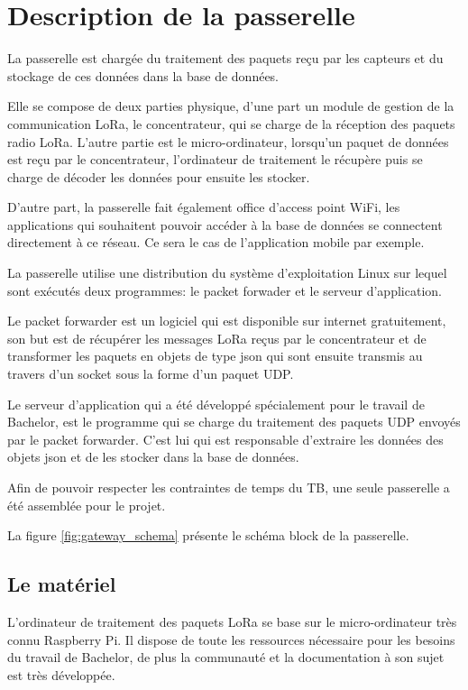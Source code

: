 
\chapter{Description de la passerelle}\label{ch:passerelle}

La passerelle est chargée du traitement des paquets reçu par les capteurs et du stockage de ces données dans la base de données. 

Elle se compose de deux parties physique, d'une part un module de gestion de la communication LoRa, le concentrateur, qui se charge de la réception des paquets radio LoRa. L'autre partie est le micro-ordinateur, lorsqu'un paquet de données est reçu par le concentrateur, l'ordinateur de traitement le récupère puis se charge de décoder les données pour ensuite les stocker.

D'autre part, la passerelle fait également office d'access point WiFi, les applications qui souhaitent pouvoir accéder à la base de données se connectent directement à ce réseau. Ce sera le cas de l'application mobile par exemple.

La passerelle utilise une distribution du système d'exploitation Linux sur lequel sont exécutés deux programmes: le packet forwader et le serveur d'application.

Le packet forwarder est un logiciel qui est disponible sur internet gratuitement, son but est de récupérer les messages LoRa reçus par le concentrateur et de transformer les paquets en objets de type json qui sont ensuite transmis au travers d'un socket sous la forme d'un paquet UDP.

Le serveur d'application qui a été développé spécialement pour le travail de Bachelor, est le programme qui se charge du traitement des paquets UDP envoyés par le packet forwarder. C'est lui qui est responsable d'extraire les données des objets json et de les stocker dans la base de données.

Afin de pouvoir respecter les contraintes de temps du TB, une seule passerelle a été assemblée pour le projet.

La figure \ref{fig:gateway_schema} présente le schéma block de la passerelle.

\section{Le matériel}

L'ordinateur de traitement des paquets LoRa se base sur le micro-ordinateur très connu Raspberry Pi. Il dispose de toute les ressources nécessaire pour les besoins du travail de Bachelor, de plus la communauté et la documentation à son sujet est très développée.

